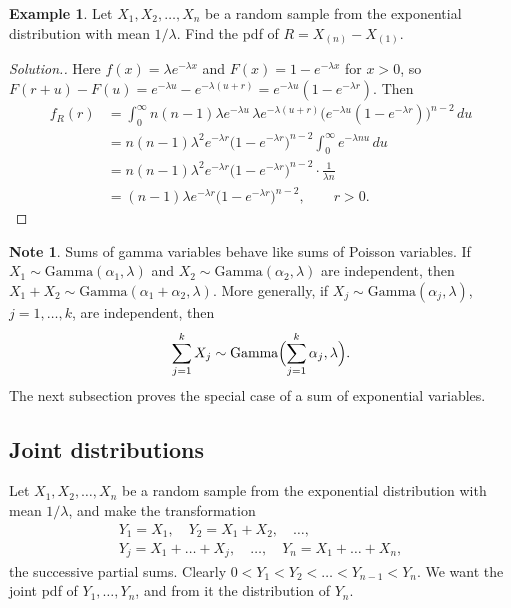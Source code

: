\documentclass[11pt,a4paper]{article}
\theoremstyle{definition}
\newtheorem{exa}[thm]{Example}
\newtheorem*{note}{Note}
\newenvironment{solution}
  {\renewcommand{\qedsymbol}{}\begin{proof}[\textit{Solution}.]}
  {\end{proof}}
\begin{document}
\begin{exa}\label{exa:exp-range}
Let $X_1, X_2, \dots, X_n$ be a random sample from the exponential distribution with mean $1/\lambda$. Find the pdf of $R = X_{(n)} - X_{(1)}$.
\end{exa}

\begin{solution}
Here $f(x) = \lambda e^{-\lambda x}$ and $F(x) = 1 - e^{-\lambda x}$ for $x > 0$, so $F(r + u) - F(u) = e^{-\lambda u} - e^{-\lambda(u+r)} = e^{-\lambda u}(1 - e^{-\lambda r})$. Then
\begin{align*}
f_R(r) &= \int_0^\infty n(n - 1)\lambda e^{-\lambda u}\,\lambda e^{-\lambda(u+r)}\bigl(e^{-\lambda u}(1 - e^{-\lambda r})\bigr)^{n-2}\,du \\
&= n(n - 1)\lambda^2e^{-\lambda r}\bigl(1 - e^{-\lambda r}\bigr)^{n-2}\int_0^\infty e^{-\lambda nu}\,du \\
&= n(n - 1)\lambda^2e^{-\lambda r}\bigl(1 - e^{-\lambda r}\bigr)^{n-2}\cdot\frac{1}{\lambda n} \\
&= (n - 1)\lambda e^{-\lambda r}\bigl(1 - e^{-\lambda r}\bigr)^{n-2} , \qquad r > 0 .
\end{align*}
\end{solution}

\begin{note}
Sums of gamma variables behave like sums of Poisson variables. If $X_1 \sim \text{Gamma}(\alpha_1, \lambda)$ and $X_2 \sim \text{Gamma}(\alpha_2, \lambda)$ are independent, then
$X_1 + X_2 \sim \text{Gamma}(\alpha_1 + \alpha_2, \lambda)$. More generally, if $X_j \sim \text{Gamma}(\alpha_j, \lambda)$, $j = 1, \dots, k$, are independent, then
\[
\sum_{j=1}^kX_j \sim \text{Gamma}\Bigl(\sum_{j=1}^k\alpha_j, \lambda\Bigr) .
\]
The next subsection proves the special case of a sum of exponential variables.
\end{note}

\subsection{Joint distributions}
Let $X_1, X_2, \dots, X_n$ be a random sample from the exponential distribution with mean $1/\lambda$, and make the transformation
\begin{gather*}
Y_1 = X_1 , \quad Y_2 = X_1 + X_2 , \quad \dots , \\
Y_j = X_1 + \dots + X_j , \quad \dots , \quad Y_n = X_1 + \dots + X_n ,
\end{gather*}
the successive partial sums. Clearly $0 < Y_1 < Y_2 < \dots < Y_{n-1} < Y_n$. We want the joint pdf of $Y_1, \dots, Y_n$, and from it the distribution of $Y_n$.
\end{document}
